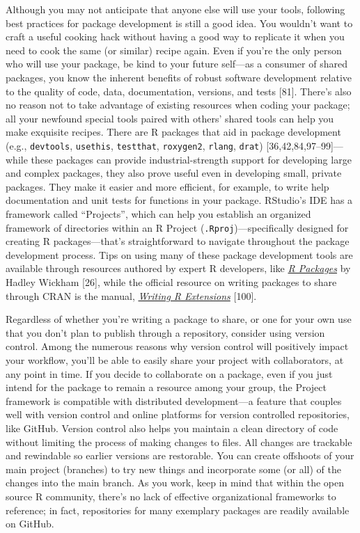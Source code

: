 \documentclass[10pt,letterpaper]{article}
\begin{document}
Although you may not anticipate that anyone else will use your tools,
following best practices for package development is still a good idea.
You wouldn't want to craft a useful cooking hack without having a good
way to replicate it when you need to cook the same (or similar) recipe
again. Even if you're the only person who will use your package, be kind
to your future self---as a consumer of shared packages, you know the
inherent benefits of robust software development relative to the quality
of code, data, documentation, versions, and tests {[}81{]}. There's also
no reason not to take advantage of existing resources when coding your
package; all your newfound special tools paired with others' shared
tools can help you make exquisite recipes. There are R packages that aid
in package development (e.g., \texttt{devtools}, \texttt{usethis},
\texttt{testthat}, \texttt{roxygen2}, \texttt{rlang}, \texttt{drat})
{[}36,42,84,97--99{]}---while these packages can provide
industrial-strength support for developing large and complex packages,
they also prove useful even in developing small, private packages. They
make it easier and more efficient, for example, to write help
documentation and unit tests for functions in your package. RStudio's
IDE has a framework called ``Projects'', which can help you establish an
organized framework of directories within an R Project
(\texttt{.Rproj})---specifically designed for creating R
packages---that's straightforward to navigate throughout the package
development process. Tips on using many of these package development
tools are available through resources authored by expert R developers,
like \href{https://r-pkgs.org/}{\emph{R Packages}} by Hadley Wickham
{[}26{]}, while the official resource on writing packages to share
through CRAN is the manual,
\href{https://cran.r-project.org/doc/manuals/r-release/R-exts.html}{\emph{Writing
R Extensions}} {[}100{]}.

Regardless of whether you're writing a package to share, or one for your
own use that you don't plan to publish through a repository, consider
using version control. Among the numerous reasons why version control
will positively impact your workflow, you'll be able to easily share
your project with collaborators, at any point in time. If you decide to
collaborate on a package, even if you just intend for the package to
remain a resource among your group, the Project framework is compatible
with distributed development---a feature that couples well with version
control and online platforms for version controlled repositories, like
GitHub. Version control also helps you maintain a clean directory of
code without limiting the process of making changes to files. All
changes are trackable and rewindable so earlier versions are restorable.
You can create offshoots of your main project (branches) to try new
things and incorporate some (or all) of the changes into the main
branch. As you work, keep in mind that within the open source R
community, there's no lack of effective organizational frameworks to
reference; in fact, repositories for many exemplary packages are readily
available on GitHub.
\end{document}

